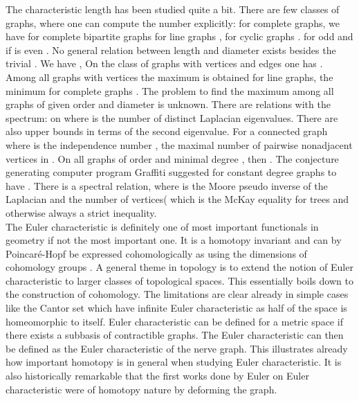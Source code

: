 \documentclass[12pt]{amsart}
\theoremstyle{definition}
\begin{document}
The characteristic length  has been studied quite a bit. There are few classes of
graphs, where one can compute the number explicitly: for complete graphs, we have 
 for complete bipartite graphs 
for line graphs , for cyclic graphs .
for odd  and  if  is even \cite{EntringerJacksonSnyder}.
No general relation between length and diameter exists besides the trivial . 
We have  \cite{DoyleGraver1},
On the class  of graphs with  vertices and  edges
one has  \cite{EntringerJacksonSnyder}.
Among all graphs with  vertices the maximum  is obtained for line graphs, the minimum  
for complete graphs \cite{DoyleGraver1}. The problem to find the maximum among all graphs of given 
order and diameter is unknown. There are relations with the spectrum:  on 
where  is the number of distinct Laplacian eigenvalues. There are also upper bounds in terms of the second
eigenvalue.  
For a connected graph  where  is the independence number \cite{Chung1988},
the maximal number of pairwise nonadjacent vertices in . 
On all graphs of order  and minimal degree , then  \cite{KouiderWinkler}.
The conjecture generating computer program Graffiti \cite{Fajtlowicz}
suggested for constant degree  graphs to have .
There is a spectral relation, where
 is the Moore pseudo inverse of the Laplacian  and  the number of vertices( \cite{Sivasubramanian}
which is the McKay equality for trees and otherwise always a strict inequality.  \\

The Euler characteristic is definitely one of most important functionals in geometry if not the 
most important one. It is a homotopy invariant and can by Poincar\'e-Hopf be expressed cohomologically 
as  using  the dimensions of cohomology groups . 
A general theme in topology is to extend the notion of Euler characteristic to larger classes of 
topological spaces. This essentially boils down to the construction of cohomology. 
The limitations are clear already in simple cases like the Cantor set which  have
infinite Euler characteristic as half of the space is homeomorphic to itself. Euler characteristic 
can be defined for a metric space if there exists a subbasis of contractible graphs. The 
Euler characteristic can then be defined as the Euler characteristic of the nerve graph. This
illustrates already how important homotopy is in general when studying Euler characteristic.
It is also historically remarkable that the first works done by Euler on Euler characteristic 
were of homotopy nature by deforming the graph.  \\
\end{document}
